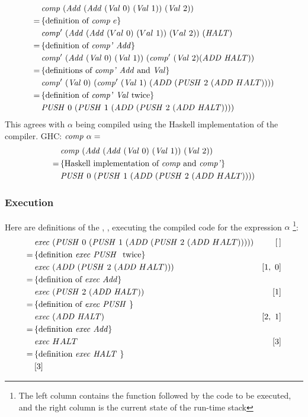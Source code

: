 \documentclass {article}
\begin{document}
\begin{align*}
&\Comp (\Add (\Add (\Val 0)\ (\Val 1))\ (\Val 2)) \\
=\, & \{ \mbox{definition of \comp\ $e$} \} \\
&\Compp  (\Add (\Add  (Val\ 0)\
			(Val\ 1))\ (Val\ 2))\ 			(\HALT) \\
=\, & \{ \mbox{definition of \compp\ \add} \} \\
&\Compp  (\Add (\Val 0)\ (\Val 1))\ (\Compp  (\Val 2) 	  (\ADD  \HALT)) \\
=\, & \{ \mbox{definitions of \compp\
		 \add\ and \val} \} \\
&\Compp  (\Val 0)\ (\Compp  (\Val 1)\
				(\ADD  (\PUSH 2\ (\ADD  HALT)))) \\
=\, & \{ \mbox{definition of \compp\ \val\ twice} \} \\
&					 \PUSH 0\ (\PUSH 1\ (\ADD  (\PUSH 2\ (\ADD  \HALT)))) \\
\end{align*}
This agrees with $\alpha$ being compiled
using the Haskell implementation of the compiler.
GHC: \( \mathit{comp\ } \alpha =\)
\begin{align*}
&\mathit{comp\ } (\mathit{Add\ } (\mathit{Add\ } (\mathit{Val\ } 0)\ (\mathit{Val\ } 1))\ (\mathit{Val\ } 2)) \\
=\, & \{ \mbox{Haskell implementation of \textit{comp}\ and \textit{comp'}} \} \\
&\mathit{PUSH\ } 0\ (\mathit{PUSH\ } 1\ (\mathit{ADD\ }  (\mathit{PUSH\ } 2\ (\mathit{ADD\ }  HALT)))) 
\end{align*}

\subsubsection{Execution}

Here are definitions of the \vm, \exec, 
executing the compiled code for the expression $\alpha$
\footnote{ The left column contains the function followed
by the code to be executed,
and the right column is the current state of the run-time stack}:
\begin{align*}
&\Exec (\PUSH 0\ (\PUSH 1\ (\ADD  (\PUSH 2\ (\ADD  HALT))))) &[\, ] \\
=\, & \{ \mbox{definition \exec\ \PUSHt\ twice} \} \\
&\Exec (\ADD  (\PUSH 2\ (\ADD  HALT))) 					&[1,\ 0] \\
=\, & \{ \mbox{definition of \exec\ \add} \} \\
&\Exec (\PUSH 2\ (\ADD \HALT)) 								&[1] \\
=\, & \{ \mbox{definition  of \exec\ \PUSHt} \} \\
&\Exec (\ADD \HALT)										 &[2,\ 1] \\
=\, & \{ \mbox{definition \exec\ \add} \} \\
&\Exec HALT 												&[3] \\
=\, & \{ \mbox{definition \exec\ \HALTt} \} \\
&[3]
\end{align*}
\end{document}
